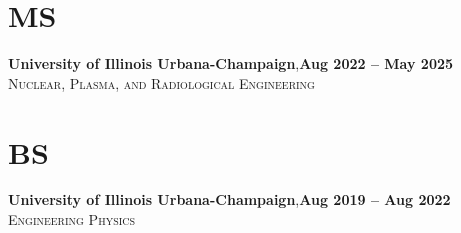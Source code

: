 \documentclass[margin,line]{resume}
\begin{document}
\begin{resume}
    \section{\mysidestyle MS}
    \textbf{University of Illinois Urbana-Champaign},\hfill\textbf{Aug 2022 -- May 2025}\\
    \textsc{Nuclear, Plasma, and Radiological Engineering}\vspace{-2mm}
    \section{\mysidestyle BS}
    \textbf{University of Illinois Urbana-Champaign},\hfill\textbf{Aug 2019 -- Aug 2022}\\
    \textsc{Engineering Physics}\vspace{-3mm}


\end{resume}
\end{document}
